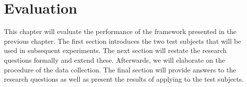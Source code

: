 
\chapter{Evaluation}
\label{ch:evaluation}
This chapter will evaluate the performance of the framework presented in the previous chapter. The first section introduces the two test subjects that will be used in subsequent experiments. The next section will restate the research questions formally and extend these. Afterwards, we will elaborate on the procedure of the data collection. The final section will provide answers to the research questions as well as present the results of applying \tcp{} to the test subjects.




\clearpage
